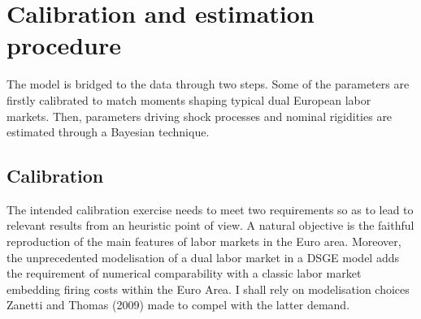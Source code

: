 \documentclass[a4paper]{article}
\begin{document}
%

\section{Calibration and estimation procedure}

The model is bridged to the data through two steps. Some of the parameters are firstly calibrated to match moments shaping typical dual European labor markets. Then, parameters driving shock processes and nominal rigidities are estimated through a Bayesian technique. 

\subsection{Calibration}

The intended calibration exercise needs to meet two requirements so as to lead to relevant results from an heuristic point of view. A natural objective is the faithful reproduction of the main features of labor markets in the Euro area. Moreover, the unprecedented modelisation of a dual labor market in a DSGE model adds the requirement of numerical comparability with a classic labor market embedding firing costs within the Euro Area. I shall rely on modelisation choices Zanetti and Thomas (2009) made to compel with the latter demand.
\end{document}
